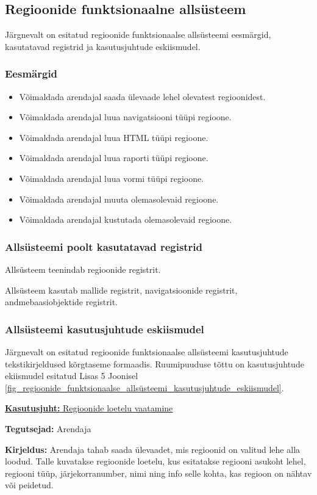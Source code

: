 \documentclass[a4paper,12pt]{article} %
\begin{document}
\subsection{Regioonide funktsionaalne allsüsteem}
Järgnevalt on esitatud regioonide funktsionaalse allsüsteemi eesmärgid, kasutatavad registrid ja kasutusjuhtude eskiismudel.
\subsubsection{Eesmärgid}
\begin{itemize}
\item Võimaldada arendajal saada ülevaade lehel olevatest regioonidest.
\item Võimaldada arendajal luua navigatsiooni tüüpi regioone.
\item Võimaldada arendajal luua HTML tüüpi regioone.
\item Võimaldada arendajal luua raporti tüüpi regioone.
\item Võimaldada arendajal luua vormi tüüpi regioone.
\item Võimaldada arendajal muuta olemasolevaid regioone.
\item Võimaldada arendajal kustutada olemasolevaid regioone.
\end{itemize}
\subsubsection{Allsüsteemi poolt kasutatavad registrid}
Allsüsteem teenindab regioonide registrit.\par
Allsüsteem kasutab mallide registrit, navigatsioonide registrit, andmebaasiobjektide registrit.
\subsubsection{Allsüsteemi kasutusjuhtude eskiismudel}
Järgnevalt on esitatud regioonide funktsionaalse allsüsteemi kasutusjuhtude tekstikirjeldused kõrgtaseme formaadis. Ruumipuuduse tõttu on kasutusjuhtude ekiismudel esitatud Lisas 5 Joonisel \ref{fig_regioonide_funktsionaalse_allsüsteemi_kasutusjuhtude_eskiismudel}.

\underline{\textbf{Kasutusjuht:} Regioonide loetelu vaatamine}
\par
\textbf{Tegutsejad:} Arendaja
\par
\textbf{Kirjeldus:} Arendaja tahab saada ülevaadet, mis regioonid on valitud lehe alla loodud. Talle kuvatakse regioonide loetelu, kus esitatakse regiooni asukoht lehel, regiooni tüüp, järjekorranumber, nimi ning info selle kohta, kas regioon on nähtav või peidetud.
\par
\end{document}
